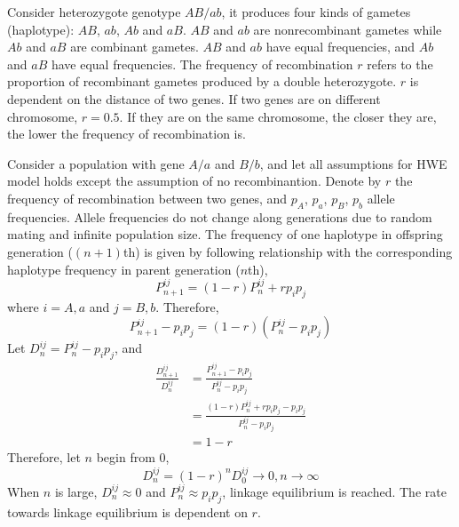 \documentclass[11pt]{article}
\begin{document}
\begin{sloppypar}
\par

Consider heterozygote genotype $AB/ab$, it produces four kinds of gametes (haplotype): $AB$, $ab$, $Ab$ and $aB$. 
$AB$ and $ab$ are nonrecombinant gametes while $Ab$ and $aB$ are combinant gametes. 
$AB$ and $ab$ have equal frequencies, and $Ab$ and $aB$ have equal frequencies. 
The frequency of recombination $r$ refers to the proportion of recombinant gametes produced by a double heterozygote. 
$r$ is dependent on the distance of two genes. 
If two genes are on different chromosome, $r=0.5$. 
If they are on the same chromosome, the closer they are, the lower the frequency of recombination is. 

\par

Consider a population with gene $A/a$ and $B/b$, and let all assumptions for HWE model holds except the assumption of no recombinantion. 
Denote by $r$ the frequency of recombination between two genes, and $p_A$, $p_a$, $p_B$, $p_b$ allele frequencies. 
Allele frequencies do not change along generations due to random mating and infinite population size. 
The frequency of one haplotype in offspring generation ($(n+1)$th) is given by following relationship with the corresponding haplotype frequency in parent generation ($n$th), 
\begin{equation}
  P^{ij}_{n+1} = (1-r)P^{ij}_n + rp_ip_j
\end{equation}
where $i=A,a$ and $j=B,b$. 
Therefore, 
\begin{equation}
  P^{ij}_{n+1}-p_ip_j = (1-r)(P^{ij}_n-p_ip_j)
\end{equation}
Let $D_n^{ij} = P^{ij}_{n}-p_ip_j$, and 
\begin{equation}
\begin{align}
  \frac{D_{n+1}^{ij}}{D_n^{ij}} &= \frac{P^{ij}_{n+1}-p_ip_j}{P^{ij}_n-p_ip_j} \\
                      &= \frac{(1-r)P^{ij}_n + rp_ip_j - p_ip_j}{P^{ij}_n-p_ip_j} \\
                      &= 1-r
\end{align}
\end{equation}
Therefore, let $n$ begin from 0, 
\begin{equation}
  D_n^{ij}=(1-r)^nD_0^{ij} \rightarrow 0, n \rightarrow \infty
\end{equation}
When $n$ is large, $D_n^{ij} \approx 0$ and $P^{ij}_n \approx p_ip_j$, linkage equilibrium is reached. 
The rate towards linkage equilibrium is dependent on $r$. 


\end{sloppypar}
\end{document}
